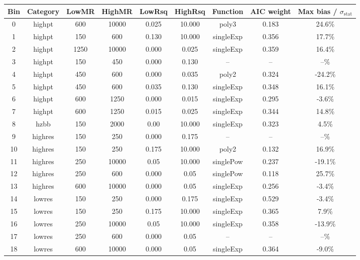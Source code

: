 \begin{table}[h]
\begin{center}
\tiny
\begin{tabular}{|c|c|cccc|c|cc|}
\hline
Bin & Category & LowMR & HighMR & LowRsq & HighRsq & Function & AIC weight & Max bias / $\sigma_{\mathrm{stat}}$ \\ 
\hline
0 & highpt & 600 & 10000 & 0.025 & 10.000 & poly3 & 0.183 & 24.6\%\\
1 & highpt & 150 & 600 & 0.130 & 10.000 & singleExp & 0.356 & 17.7\%\\
2 & highpt & 1250 & 10000 & 0.000 & 0.025 & singleExp & 0.359 & 16.4\%\\
3 & highpt & 150 & 450 & 0.000 & 0.130 & -- & -- & --\%\\
4 & highpt & 450 & 600 & 0.000 & 0.035 & poly2 & 0.324 & -24.2\%\\
5 & highpt & 450 & 600 & 0.035 & 0.130 & singleExp & 0.348 & 16.1\%\\
6 & highpt & 600 & 1250 & 0.000 & 0.015 & singleExp & 0.295 & -3.6\%\\
7 & highpt & 600 & 1250 & 0.015 & 0.025 & singleExp & 0.344 & 14.8\%\\
\hline
8 & hzbb & 150 & 2000 & 0.00 & 10.000 & singleExp & 0.323 & 4.5\%\\ 
\hline
9 & highres & 150 & 250 & 0.000 & 0.175 & -- & -- & --\%\\
10 & highres & 150 & 250 & 0.175 & 10.000 & poly2 & 0.132 & 16.9\%\\
11 & highres & 250 & 10000 & 0.05 & 10.000 & singlePow & 0.237 & -19.1\%\\
12 & highres & 250 & 600 & 0.000 & 0.05 & singlePow & 0.118 & 25.7\%\\
13 & highres & 600 & 10000 & 0.000 & 0.05 & singleExp & 0.256 & -3.4\%\\
\hline
14 & lowres & 150 & 250 & 0.000 & 0.175 & singleExp & 0.529 & -3.4\%\\
15 & lowres & 150 & 250 & 0.175 & 10.000 & singleExp & 0.365 & 7.9\%\\
16 & lowres & 250 & 10000 & 0.05 & 10.000 & singleExp & 0.358 & -13.9\%\\
17 & lowres &  250 & 600 & 0.000 & 0.05 & --  & --  &  --\%\\
18 & lowres & 600 & 10000 & 0.000 & 0.05 & singleExp & 0.364 & -9.0\%\\
\hline
\end{tabular}
\label{tab:modelSelectionSummary_15ifb}
\end{center}
\end{table}
